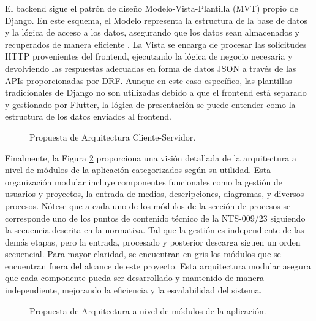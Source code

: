 El backend sigue el patrón de diseño Modelo-Vista-Plantilla (MVT) propio de Django. En este esquema, el Modelo representa la estructura de la base de datos y la lógica de acceso a los datos, asegurando que los datos sean almacenados y recuperados de manera eficiente \cite{vincent2022django}. La Vista se encarga de procesar las solicitudes HTTP provenientes del frontend, ejecutando la lógica de negocio necesaria y devolviendo las respuestas adecuadas en forma de datos JSON a través de las APIs proporcionadas por DRF. Aunque en este caso específico, las plantillas tradicionales de Django no son utilizadas debido a que el frontend está separado y gestionado por Flutter, la lógica de presentación se puede entender como la estructura de los datos enviados al frontend.

\begin{figure}[h]
	\centering
    \resizebox{\textwidth}{!}{
        {\setlength{\fboxsep}{14pt} %
        \fbox{}}}
	\caption{Propuesta de Arquitectura Cliente-Servidor.}
	\label{fig:arc_client_server} 
\end{figure}

Finalmente, la Figura \ref{fig:arc_modulos} proporciona una visión detallada de la arquitectura a nivel de módulos de la aplicación categorizados según su utilidad. Esta organización modular incluye componentes funcionales como la gestión de usuarios y proyectos, la entrada de medios, descripciones, diagramas, y diversos procesos. Nótese que a cada uno de los módulos de la sección de procesos se corresponde uno de los puntos de contenido técnico de la NTS-009/23 siguiendo la secuencia descrita en la normativa. Tal que la gestión es independiente de las demás etapas, pero la entrada, procesado y posterior descarga siguen un orden secuencial. Para mayor claridad, se encuentran en gris los módulos que se encuentran fuera del alcance de este proyecto. Esta arquitectura modular asegura que cada componente pueda ser desarrollado y mantenido de manera independiente, mejorando la eficiencia y la escalabilidad del sistema.

\begin{figure}[H]
	\centering
    \resizebox{\textwidth}{!}{
        {\setlength{\fboxsep}{14pt} %
        \fbox{}}}
	\caption{Propuesta de Arquitectura a nivel de módulos de la aplicación.}
	\label{fig:arc_modulos} 
\end{figure}

